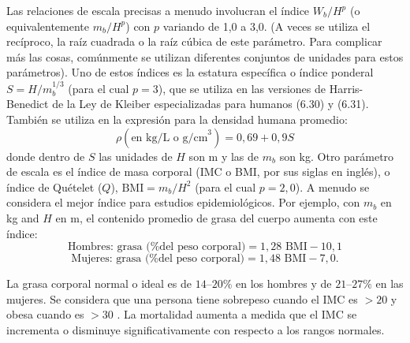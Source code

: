\documentclass[12pt]{book}
\begin{document}
Las relaciones de escala precisas a menudo involucran el índice $W_b/H^p$ (o equivalentemente $m_b/H^p$) con $p$ variando de 1,0 a 3,0. (A veces se utiliza el recíproco, la raíz cuadrada o la raíz cúbica de este parámetro. Para complicar más las cosas, comúnmente se utilizan diferentes conjuntos de unidades para estos parámetros). Uno de estos índices es la estatura específica o índice ponderal $S = H/m_b^{1/3}$ (para el cual $p = 3$), que se utiliza en las versiones de Harris-Benedict de la Ley de Kleiber especializadas para humanos (6.30) y (6.31). También se utiliza en la expresión para la densidad humana promedio:
\begin{equation}
\rho (\text{en kg/L o g/cm}^3) = 0,69 + 0,9 S
\label{eq:1.3}
\end{equation}
donde dentro de $S$ las unidades de $H$ son m y las de $m_b$ son kg. Otro parámetro de escala es el índice de masa corporal (IMC o BMI, por sus siglas en inglés), o índice de Quételet ($Q$), $\text{BMI} = m_b/H^2$ (para el cual $p = 2,0$). A menudo se considera el mejor índice para estudios epidemiológicos. Por ejemplo, con $m_b$ en kg and $H$ en m, el contenido promedio de grasa del cuerpo aumenta con este índice:
\begin{equation}
\text{Hombres: grasa (\% del peso corporal)} = 1,28 \text{ BMI} - 10,1
\label{eq:1.4}
\end{equation}
\begin{equation}
\text{Mujeres: grasa (\% del peso corporal)} = 1,48 \text{ BMI} - 7,0.
\label{eq:1.5}
\end{equation}

La grasa corporal normal o ideal es de $14\text{--}20\%$ en los hombres y de $21\text{--}27\%$ en las mujeres. Se considera que una persona tiene sobrepeso cuando el IMC es $> 20$ y obesa cuando es $> 30$ \cite{1}. La mortalidad aumenta a medida que el IMC se incrementa o disminuye significativamente con respecto a los rangos normales.
\end{document}
